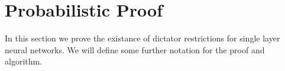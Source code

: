 \section{Probabilistic Proof}
\label{sec:single_layer}
In this section we prove the existance of dictator restrictions for single layer neural networks.
We will define some further notation for the proof and algorithm.

